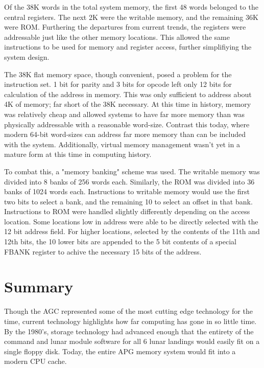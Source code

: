 \documentclass[a4paper,11pt]{article}
\begin{document}
Of the 38K words in the total system memory, the first 48 words belonged to the central registers.  The next 2K were the writable memory, and the remaining 36K were ROM.  Furthering the departures from current trends, the registers were addressable just like the other memory locations.  This allowed the same instructions to be used for memory and register access, further simplifiying the system design.  

The 38K flat memory space, though convenient, posed a problem for the instruction set.  1 bit for parity and 3 bits for opcode left only 12 bits for calculation of the address in memory.  This was only sufficient to address about 4K of memory; far short of the 38K necessary.  At this time in history, memory was relatively cheap and allowed systems to have far more memory than was physically addressable with a reasonable word-size.  Contrast this today, where modern 64-bit word-sizes can address far more memory than can be included with the system.  Additionally, virtual memory management wasn't yet in a mature form at this time in computing history. 

To combat this, a "memory banking" scheme was used. The writable memory was divided into 8 banks of 256 words each.  Similarly, the ROM was divided into 36 banks of 1024 words each.  Instructions to writable memory would use the first two bits to select a bank, and the remaining 10 to select an offset in that bank.  Instructions to ROM were handled slightly differently depending on the access location.  Some locations low in address were able to be directly selected with the 12 bit address field.  For higher locations, selected by the contents of the 11th and 12th bits, the 10 lower bits are appended to the 5 bit contents of a special FBANK register to achive the necessary 15 bits of the address.  


\section{Summary}
Though the AGC represented some of the most cutting edge technology for the time, current technology highlights how far computing has gone in so little time.  By the 1980's, storage technology had advanced enough that the entirety of the command and lunar module software for all 6 lunar landings would easily fit on a single floppy disk.  Today, the entire APG memory system would fit into a modern CPU cache.
\end{document}
